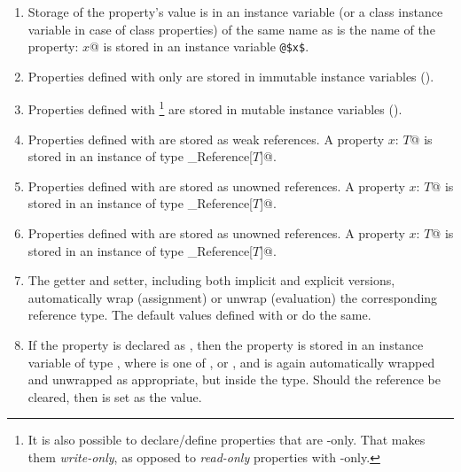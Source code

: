 \begin{enumerate}
\item 
Storage of the property's value is in an instance variable (or a class instance variable in case of class properties) of the same name as is the name of the property: \lstinline@property $x$@ is stored in an instance variable \lstinline+@$x$+. 

\item
Properties defined with only  are stored in immutable instance variables (). 

\item
Properties defined with \footnote{It is also possible to declare/define properties that are -only. That makes them {\em write-only}, as opposed to {\em read-only} properties with -only.} are stored in mutable instance variables (). 

\item
Properties defined with  are stored as weak references. A property \lstinline@property $x$: $T$@ is stored in an instance of type \lstinline@Weak_Reference[$T$]@. 

\item
Properties defined with  are stored as unowned references. A property \lstinline@property $x$: $T$@ is stored in an instance of type \lstinline@Unowned_Reference[$T$]@. 

\item
Properties defined with  are stored as unowned references. A property \lstinline@property $x$: $T$@ is stored in an instance of type \lstinline@Soft_Reference[$T$]@. 

\item
The getter and setter, including both implicit and explicit versions, automatically wrap (assignment) or unwrap (evaluation) the corresponding reference type. The default values defined with  or  do the same. 

\item
If the property is declared as , then the property is stored in an instance variable of type , where  is one of ,  or , and is again automatically wrapped and unwrapped as appropriate, but inside the  type. Should the reference be cleared, then  is set as the value. 

\end{enumerate}

